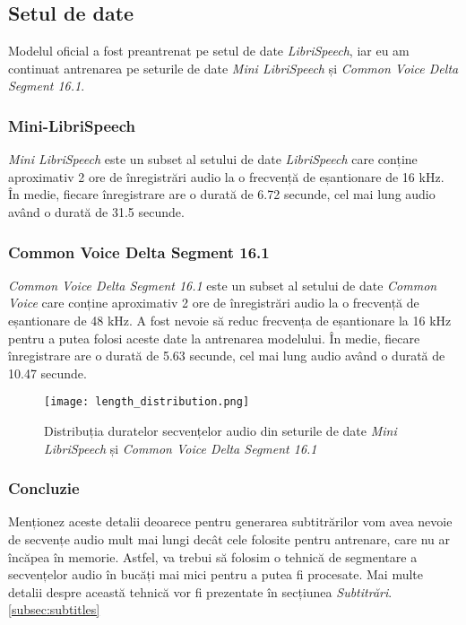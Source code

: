 
\subsection{Setul de date}
Modelul oficial a fost preantrenat pe setul de date \textit{LibriSpeech}, iar eu am continuat
antrenarea pe seturile de date \textit{Mini LibriSpeech} și \textit{Common Voice Delta Segment 16.1}.

\subsubsection{Mini-LibriSpeech}
\textit{Mini LibriSpeech} este un subset al setului de date \textit{LibriSpeech} care conține 
aproximativ 2 ore de înregistrări audio la o frecvență de eșantionare de 16 kHz. În medie,
fiecare înregistrare are o durată de 6.72 secunde, cel mai lung audio având o durată de 31.5 secunde.

\subsubsection{Common Voice Delta Segment 16.1}
\textit{Common Voice Delta Segment 16.1} este un subset al setului de date \textit{Common Voice}
care conține aproximativ 2 ore de înregistrări audio la o frecvență de eșantionare de 48 kHz.
A fost nevoie să reduc frecvența de eșantionare la 16 kHz pentru a putea folosi aceste date la
antrenarea modelului. În medie, fiecare înregistrare are o durată de 5.63 secunde, cel mai lung
audio având o durată de 10.47 secunde.

\begin{figure}[h]
    \centering
    \texttt{[image: length\_distribution.png]}
    \caption{Distribuția duratelor secvențelor audio din seturile de date \textit{Mini LibriSpeech} și \textit{Common Voice Delta Segment 16.1}}
    \label{fig:length-distribution}
\end{figure}

\subsubsection{Concluzie}
Menționez aceste detalii deoarece pentru generarea subtitrărilor vom avea nevoie de secvențe audio
mult mai lungi decât cele folosite pentru antrenare, care nu ar încăpea în memorie. Astfel, va trebui
să folosim o tehnică de segmentare a secvențelor audio în bucăți mai mici pentru a putea fi procesate.
Mai multe detalii despre această tehnică vor fi prezentate în secțiunea \textit{Subtitrări}. \ref{subsec:subtitles}

